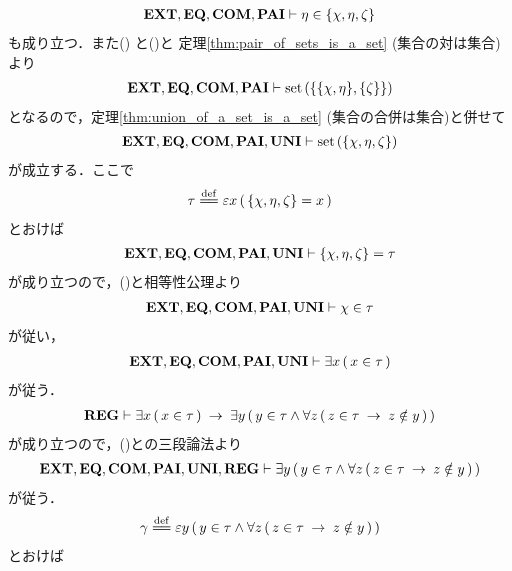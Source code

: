 \begin{sketch}
\begin{align}
			\mbox{{\bf EXT}},\mbox{{\bf EQ}},\mbox{\bf COM},\mbox{{\bf PAI}} \vdash \eta \in \{\chi,\eta,\zeta\}
			\label{fom:no_three_sets_go_round_8}
		\end{align}
		も成り立つ．また()
		と()と
		定理\ref{thm:pair_of_sets_is_a_set} (集合の対は集合)より
		\begin{align}
			\mbox{{\bf EXT}},\mbox{{\bf EQ}},\mbox{\bf COM},\mbox{{\bf PAI}} \vdash \operatorname*{set}\hspace{0.15em}(\{\{\chi,\eta\},\{\zeta\}\})
		\end{align}
		となるので，定理\ref{thm:union_of_a_set_is_a_set} (集合の合併は集合)と併せて
		\begin{align}
			\mbox{{\bf EXT}},\mbox{{\bf EQ}},\mbox{\bf COM},\mbox{{\bf PAI}},\mbox{{\bf UNI}} \vdash \operatorname*{set}\hspace{0.15em}(\{\chi,\eta,\zeta\})
		\end{align}
		が成立する．ここで
		\begin{align}
			\tau \defeq \varepsilon x\, (\, \{\chi,\eta,\zeta\} = x\, )
			\label{fom:no_three_sets_go_round_9}
		\end{align}
		とおけば
		\begin{align}
			\mbox{{\bf EXT}},\mbox{{\bf EQ}},\mbox{\bf COM},\mbox{{\bf PAI}},\mbox{{\bf UNI}} \vdash \{\chi,\eta,\zeta\} = \tau
			\label{fom:no_three_sets_go_round_10}
		\end{align}
		が成り立つので，()と相等性公理より
		\begin{align}
			\mbox{{\bf EXT}},\mbox{{\bf EQ}},\mbox{\bf COM},\mbox{{\bf PAI}},\mbox{{\bf UNI}} \vdash \chi \in \tau
			\label{fom:no_three_sets_go_round_11}
		\end{align}
		が従い，
		\begin{align}
			\mbox{{\bf EXT}},\mbox{{\bf EQ}},\mbox{\bf COM},\mbox{{\bf PAI}},\mbox{{\bf UNI}} \vdash \exists x\, (\, x \in \tau\, )
			\label{fom:no_three_sets_go_round_12}
		\end{align}
		が従う．
		\begin{align}
			\mbox{{\bf REG}} \vdash \exists x\, (\, x \in \tau\, )
			\hspace{0.25em}\rightarrow\hspace{0.25em} \exists y\, (\, y \in \tau \wedge \forall z\, (\, z \in \tau \hspace{0.25em}\rightarrow\hspace{0.25em} z \notin y\, )\, )
		\end{align}
		が成り立つので，()との三段論法より
		\begin{align}
			\mbox{{\bf EXT}},\mbox{{\bf EQ}},\mbox{\bf COM},\mbox{{\bf PAI}},\mbox{{\bf UNI}},\mbox{{\bf REG}} \vdash 
			\exists y\, (\, y \in \tau \wedge \forall z\, (\, z \in \tau \hspace{0.25em}\rightarrow\hspace{0.25em} z \notin y\, )\, )
		\end{align}
		が従う．
		\begin{align}
			\gamma \defeq \varepsilon y\, (\, y \in \tau \wedge \forall z\, (\, z \in \tau \rarrow z \notin y\, )\, )
		\end{align}
		とおけば
		\begin{align}

\end{align}
\end{sketch}
